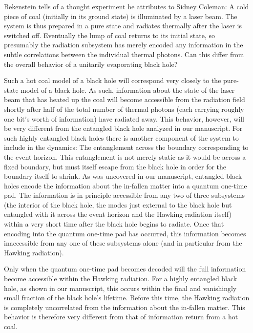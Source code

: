 \documentclass[twocolumn,aps,showpacs,prl]{revtex4}
\begin{document}
Bekenstein \cite{Bekapp} tells of a thought experiment he attributes to
Sidney Coleman: A cold piece of coal (initially in its ground state) is
illuminated by a laser beam. The system is thus prepared in a pure state
and radiates thermally after the laser is switched off. Eventually
the lump of coal returns to its initial state, so presumably the
radiation subsystem has merely encoded any information in the subtle
correlations between the individual thermal photons. Can this differ
from the overall behavior of a unitarily evaporating black hole?

Such a hot coal model of a black hole will correspond very closely to
the pure-state model of a black hole. As such, information about the state
of the laser beam that has heated up the coal will become accessible
from the radiation field shortly after half of the total number of thermal
photons (each carrying roughly one bit's worth of information) have
radiated away. This behavior, however, will be very different from the
entangled black hole analyzed in our manuscript. For such highly entangled
black holes there is another component of the system to include in the
dynamics: The entanglement across the boundary corresponding to the
event horizon. This entanglement is not merely static  as it would be across
a fixed boundary, but must itself escape from the black hole in order
for the boundary itself to shrink. As was uncovered in our manuscript, 
entangled black holes encode the information about the in-fallen matter
into a quantum one-time pad. The information is in principle accessible
from any two of three subsystems (the interior of the black hole, the
modes just external to the black hole but entangled with it across
the event horizon and the Hawking radiation itself) within a very short
time after the black hole begins to radiate. Once that encoding into
the quantum one-time pad has occurred, this information becomes
inaccessible from any one of these subsystems alone (and in particular
from the Hawking radiation).

Only when the quantum one-time pad becomes decoded will the full information
become accessible within the Hawking radiation. For a highly entangled
black hole, as shown in our manuscript, this occurs within the final
and vanishingly small fraction of the black hole's lifetime. Before
this time, the Hawking radiation is completely uncorrelated from the
information about the in-fallen matter. This behavior is therefore
very different from that of information return from a hot coal.
\end{document}

